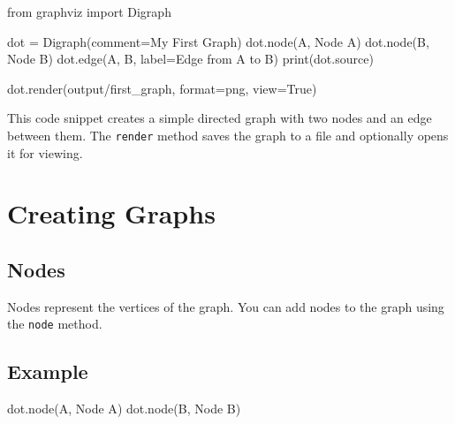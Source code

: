 \documentclass[
  letterpaper,
  DIV=11,
  numbers=noendperiod]{scrreprt}
\newenvironment{Shaded}{\begin{snugshade}}{\end{snugshade}}
\newcommand{\BuiltInTok}[1]{\textcolor[rgb]{0.00,0.23,0.31}{#1}}
\newcommand{\ImportTok}[1]{\textcolor[rgb]{0.00,0.46,0.62}{#1}}
\newcommand{\NormalTok}[1]{\textcolor[rgb]{0.00,0.23,0.31}{#1}}
\newcommand{\OperatorTok}[1]{\textcolor[rgb]{0.37,0.37,0.37}{#1}}
\newcommand{\StringTok}[1]{\textcolor[rgb]{0.13,0.47,0.30}{#1}}
\newcommand{\VariableTok}[1]{\textcolor[rgb]{0.07,0.07,0.07}{#1}}
\begin{document}
\begin{Shaded}
\begin{Highlighting}[]
\ImportTok{from}\NormalTok{ graphviz }\ImportTok{import}\NormalTok{ Digraph}

\NormalTok{dot }\OperatorTok{=}\NormalTok{ Digraph(comment}\OperatorTok{=}\StringTok{\textquotesingle{}My First Graph\textquotesingle{}}\NormalTok{)}
\NormalTok{dot.node(}\StringTok{\textquotesingle{}A\textquotesingle{}}\NormalTok{, }\StringTok{\textquotesingle{}Node A\textquotesingle{}}\NormalTok{)}
\NormalTok{dot.node(}\StringTok{\textquotesingle{}B\textquotesingle{}}\NormalTok{, }\StringTok{\textquotesingle{}Node B\textquotesingle{}}\NormalTok{)}
\NormalTok{dot.edge(}\StringTok{\textquotesingle{}A\textquotesingle{}}\NormalTok{, }\StringTok{\textquotesingle{}B\textquotesingle{}}\NormalTok{, label}\OperatorTok{=}\StringTok{\textquotesingle{}Edge from A to B\textquotesingle{}}\NormalTok{)}
\BuiltInTok{print}\NormalTok{(dot.source)}

\NormalTok{dot.render(}\StringTok{\textquotesingle{}output/first\_graph\textquotesingle{}}\NormalTok{, }\BuiltInTok{format}\OperatorTok{=}\StringTok{\textquotesingle{}png\textquotesingle{}}\NormalTok{, view}\OperatorTok{=}\VariableTok{True}\NormalTok{)}
\end{Highlighting}
\end{Shaded}

This code snippet creates a simple directed graph with two nodes and an
edge between them. The \texttt{render} method saves the graph to a file
and optionally opens it for viewing.

\section{Creating Graphs}\label{creating-graphs}

\subsection{Nodes}\label{nodes}

Nodes represent the vertices of the graph. You can add nodes to the
graph using the \texttt{node} method.

\subsection{Example}\label{example-41}

\begin{Shaded}
\begin{Highlighting}[]
\NormalTok{dot.node(}\StringTok{\textquotesingle{}A\textquotesingle{}}\NormalTok{, }\StringTok{\textquotesingle{}Node A\textquotesingle{}}\NormalTok{)}
\NormalTok{dot.node(}\StringTok{\textquotesingle{}B\textquotesingle{}}\NormalTok{, }\StringTok{\textquotesingle{}Node B\textquotesingle{}}\NormalTok{)}
\end{Highlighting}
\end{Shaded}
\end{document}
